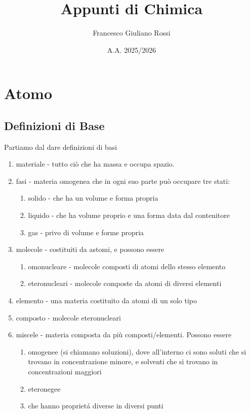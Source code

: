 \documentclass[a4paper]{article}
\title{Appunti di Chimica}
\author{Francesco Giuliano Rossi}
\date{A.A. 2025/2026}
\begin{document}
\maketitle
\tableofcontents
\newpage

\section{Atomo}
\subsection{Definizioni di Base}
Partiamo dal dare definizioni di basi 
\begin{enumerate}
    \item materiale - tutto ciò che ha massa e occupa spazio. 
    \item fasi - materia omogenea che in ogni suo parte può occupare tre stati:
    \begin{enumerate}
        \item solido - che ha un volume e forma propria
        \item liquido - che ha volume proprio e una forma data dal contenitore
        \item gas - privo di volume e forme propria
    \end{enumerate}
    \item molecole - costituiti da astomi, e possono essere 
        \begin{enumerate}
        \item omonucleare - molecole composti di atomi dello stesso elemento
        \item eteronucleari - molecole composte da atomi di diversi elementi
        \end{enumerate}
    \item elemento - una materia costituito da atomi di un solo tipo 
    \item composto - molecole eteronucleari
    \item miscele - materia composta da più composti/elementi. Possono essere
    \begin{enumerate}
        \item omogenee (si chiamano soluzioni), dove all'interno ci sono soluti che si trovano in concentrazione minore, e solventi che si trovano in concentrazioni maggiori
        \item eteronegee
        \item che hanno proprietá diverse in diversi punti
    \end{enumerate}
\end{enumerate}
\end{document}
